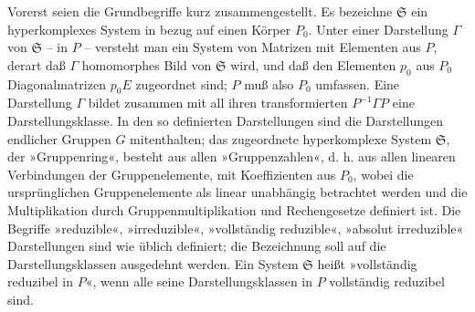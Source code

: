 \documentclass[11pt]{article}
\providecommand{\mS}{\mathfrak{S}}
\begin{document}
Vorerst seien die Grundbegriffe kurz zusammengestellt. Es bezeichne $\mS$ ein hyperkomplexes System in bezug auf einen Körper $P_0$. Unter einer Darstellung $\Gamma$ von $\mS$ -- in $P$ -- versteht man ein System von Matrizen mit Elementen aus $P$, derart daß $\Gamma$ homomorphes Bild von $\mS$ wird, und daß den Elementen $p_0$ aus $P_0$ Diagonalmatrizen $p_0E$ zugeordnet sind; $P$ muß also $P_0$ umfassen. Eine Darstellung $\Gamma$ bildet zusammen mit all ihren transformierten $P^{-1}\Gamma P$ eine Darstellungsklasse. In den so definierten Darstellungen sind die Darstellungen endlicher Gruppen $G$ mitenthalten; das zugeordnete hyperkomplexe System $\mS$, der »Gruppenring«, besteht aus allen »Gruppenzahlen«, d. h. aus allen linearen Verbindungen der Gruppenelemente, mit Koeffizienten aus $P_0$, wobei die ursprünglichen Gruppenelemente als linear unabhängig betrachtet werden und die Multiplikation durch Gruppenmultiplikation und Rechengesetze definiert ist. Die Begriffe »reduzible«, »irreduzible«, »vollständig reduzible«, »absolut irreduzible« Darstellungen sind wie üblich definiert; die Bezeichnung soll auf die Darstellungsklassen ausgedehnt werden. Ein System $\mS$ heißt »vollständig reduzibel in $P$«, wenn alle seine Darstellungsklassen in $P$ vollständig reduzibel sind.
\end{document}
